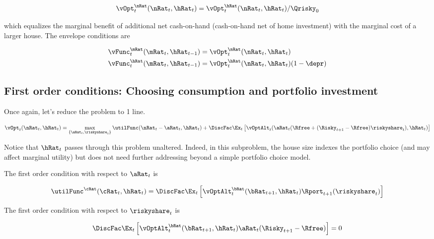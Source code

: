 \documentclass[PortfolioChoiceWithRiskyHousing]{subfiles}
\begin{document}
\begin{equation}
	\vOpt_{t}^{\nRat}(\nRat_{t}, \hRat_{t}) =  \vOpt_{t}^{\hRat}(\nRat_{t}, \hRat_{t})/\Qrisky_0
\end{equation}

which equalizes the marginal benefit of additional net cash-on-hand (cash-on-hand net of home investment) with the marginal cost of a larger house. The envelope conditions are

\begin{equation}
	\begin{split}
		\vFunc_{t}^{\mRat}(\mRat_{t}, \hRat_{t-1}) & = \vOpt_{t}^{\nRat}(\nRat_{t}, \hRat_{t}) \\
		\vFunc_{t}^{\hRat}(\mRat_{t}, \hRat_{t-1}) & = \vOpt_{t}^{\hRat}(\nRat_{t}, \hRat_{t})(1-\depr)
	\end{split}
\end{equation}

\subsection{First order conditions: Choosing consumption and portfolio investment}

Once again, let's reduce the problem to 1 line.

\begin{equation}
	\vOpt_{t}(\nRat_{t}, \hRat_{t}) = \max_{\{\aRat_{t}, \riskyshare_{t}\}} \utilFunc(\nRat_{t} - \aRat_{t}, \hRat_{t}) + \DiscFac \Ex_{t}\left[ \vOptAlt_{t}(\aRat_{t}(\Rfree + (\Risky_{t+1} - \Rfree)\riskyshare_{t}), \hRat_{t}) \right]
\end{equation}

Notice that $\hRat_{t}$ passes through this problem unaltered. Indeed, in this subproblem, the house size indexes the portfolio choice (and may affect marginal utility) but does not need further addressing beyond a simple portfolio choice model.

The first order condition with respect to $\aRat_{t}$ is

\begin{equation}
	\utilFunc^{\cRat}(\cRat_{t}, \hRat_{t})  = \DiscFac \Ex_{t} \left[ \vOptAlt_{t}^{\bRat}(\bRat_{t+1}, \hRat_{t})\Rport_{t+1}(\riskyshare_{t}) \right]
\end{equation}

The first order condition with respect to $\riskyshare_{t}$ is

\begin{equation}
	\DiscFac \Ex_{t}\left[ \vOptAlt_{t}^{\bRat}(\bRat_{t+1}, \hRat_{t})\aRat_{t}(\Risky_{t+1}-\Rfree) \right] = 0
\end{equation}
\end{document}
